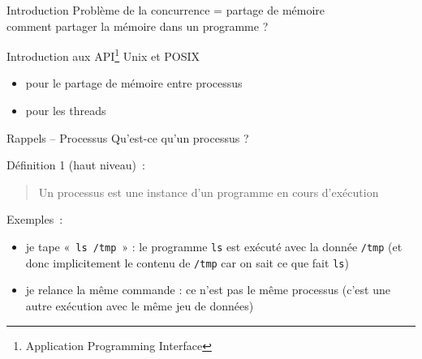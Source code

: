 %
%

\def\inc{inc2-api}




\begin {frame} {Introduction}
    Problème de la concurrence = partage de mémoire \\
    \implique comment partager la mémoire dans un programme ?

    \vfill

    Introduction aux API\footnote {Application Programming Interface}
    Unix et POSIX

    \begin {itemize}
	\item pour le partage de mémoire entre processus
	\item pour les threads
    \end {itemize}
\end {frame}




\begin {frame} {Rappels -- Processus}
    Qu'est-ce qu'un processus ?

    \vfill

    Définition 1 (haut niveau)~:
    \begin {quote}
	Un processus est une instance d'un programme
	en cours d'exécution

    \end {quote}

    \vfill

    Exemples~:
    \begin {itemize}
	\item je tape «~\texttt {ls /tmp}~» : le programme \texttt {ls}
	    est exécuté avec la donnée \texttt {/tmp}
	    (et donc implicitement le contenu de \texttt {/tmp} car on
	    sait ce que fait \texttt {ls})

	\item je relance la même commande : ce n'est pas le même
	    processus (c'est une autre exécution avec le même jeu de
	    données)

    \end {itemize}
\end {frame}



